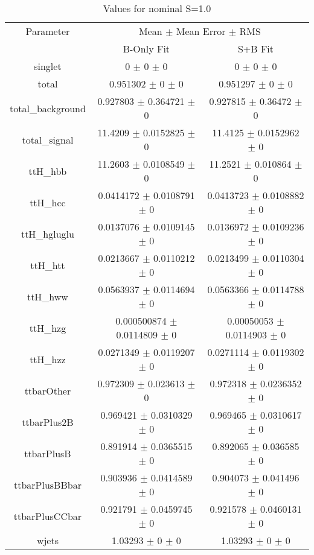 \begin{table}
\centering
\caption{Values for nominal S=1.0}
\begin{tabular}{ccc}
\toprule
Parameter & \multicolumn{2}{c}{Mean $\pm$ Mean Error $\pm$ RMS}\\
 & B-Only Fit & S+B Fit\\
\midrule
singlet & \num{0} $\pm$ \num{0} $\pm$ \num{0} & \num{0} $\pm$ \num{0} $\pm$ \num{0}\\
total & \num{0.951302} $\pm$ \num{0} $\pm$ \num{0} & \num{0.951297} $\pm$ \num{0} $\pm$ \num{0}\\
total\_background & \num{0.927803} $\pm$ \num{0.364721} $\pm$ \num{0} & \num{0.927815} $\pm$ \num{0.36472} $\pm$ \num{0}\\
total\_signal & \num{11.4209} $\pm$ \num{0.0152825} $\pm$ \num{0} & \num{11.4125} $\pm$ \num{0.0152962} $\pm$ \num{0}\\
ttH\_hbb & \num{11.2603} $\pm$ \num{0.0108549} $\pm$ \num{0} & \num{11.2521} $\pm$ \num{0.010864} $\pm$ \num{0}\\
ttH\_hcc & \num{0.0414172} $\pm$ \num{0.0108791} $\pm$ \num{0} & \num{0.0413723} $\pm$ \num{0.0108882} $\pm$ \num{0}\\
ttH\_hgluglu & \num{0.0137076} $\pm$ \num{0.0109145} $\pm$ \num{0} & \num{0.0136972} $\pm$ \num{0.0109236} $\pm$ \num{0}\\
ttH\_htt & \num{0.0213667} $\pm$ \num{0.0110212} $\pm$ \num{0} & \num{0.0213499} $\pm$ \num{0.0110304} $\pm$ \num{0}\\
ttH\_hww & \num{0.0563937} $\pm$ \num{0.0114694} $\pm$ \num{0} & \num{0.0563366} $\pm$ \num{0.0114788} $\pm$ \num{0}\\
ttH\_hzg & \num{0.000500874} $\pm$ \num{0.0114809} $\pm$ \num{0} & \num{0.00050053} $\pm$ \num{0.0114903} $\pm$ \num{0}\\
ttH\_hzz & \num{0.0271349} $\pm$ \num{0.0119207} $\pm$ \num{0} & \num{0.0271114} $\pm$ \num{0.0119302} $\pm$ \num{0}\\
ttbarOther & \num{0.972309} $\pm$ \num{0.023613} $\pm$ \num{0} & \num{0.972318} $\pm$ \num{0.0236352} $\pm$ \num{0}\\
ttbarPlus2B & \num{0.969421} $\pm$ \num{0.0310329} $\pm$ \num{0} & \num{0.969465} $\pm$ \num{0.0310617} $\pm$ \num{0}\\
ttbarPlusB & \num{0.891914} $\pm$ \num{0.0365515} $\pm$ \num{0} & \num{0.892065} $\pm$ \num{0.036585} $\pm$ \num{0}\\
ttbarPlusBBbar & \num{0.903936} $\pm$ \num{0.0414589} $\pm$ \num{0} & \num{0.904073} $\pm$ \num{0.041496} $\pm$ \num{0}\\
ttbarPlusCCbar & \num{0.921791} $\pm$ \num{0.0459745} $\pm$ \num{0} & \num{0.921578} $\pm$ \num{0.0460131} $\pm$ \num{0}\\
wjets & \num{1.03293} $\pm$ \num{0} $\pm$ \num{0} & \num{1.03293} $\pm$ \num{0} $\pm$ \num{0}\\
\bottomrule
\end{tabular}
\end{table}